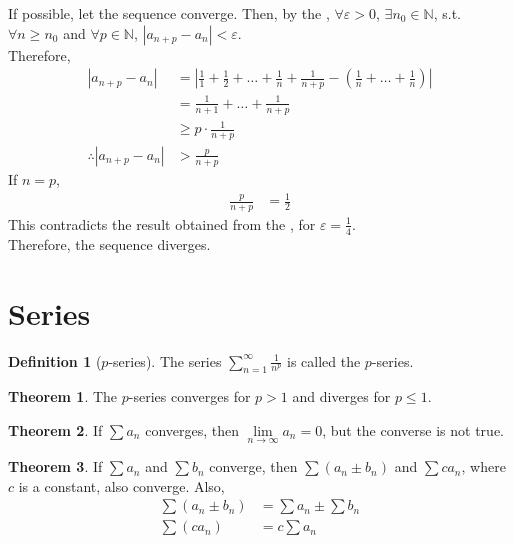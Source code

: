 \documentclass[fleqn, a4paper, 8pt, twoside]{amsart}
\theoremstyle{definition}
\theoremstyle{bluedefinition}
\newtheorem{definition}{Definition}
\theoremstyle{redtheorem}
\newtheorem{theorem}{Theorem}
\begin{document}
\begin{multicols}{2}
\begin{spacing}{0.7}
\begin{solution}
	If possible, let the sequence converge.
	Then, by the , $\forall \varepsilon > 0$, $\exists n_0 \in \mathbb{N}$, s.t. $\forall n \geq n_0$ and $\forall p \in \mathbb{N}$, $|a_{n + p} - a_n| < \varepsilon$.\\
	Therefore,
	\begin{align*}
		|a_{n + p} - a_n| &= \left| \frac{1}{1} + \frac{1}{2} + \dots + \frac{1}{n} + \frac{1}{n + p} - \left( \frac{1}{n} + \dots + \frac{1}{n} \right) \right|\\
		&= \frac{1}{n + 1} + \dots + \frac{1}{n + p}\\
		&\ge p \cdot \frac{1}{n + p}\\
		\therefore |a_{n + p} - a_n| &> \frac{p}{n + p}
	\end{align*}
	If $n = p$,
	\begin{align*}
		\frac{p}{n + p} &= \frac{1}{2}
	\end{align*}
	This contradicts the result obtained from the , for $\varepsilon = \frac{1}{4}$.\\
	Therefore, the sequence diverges.
\end{solution}

\section{Series}

\begin{definition}[$p$-series]
	The series $\sum\limits_{n = 1}^{\infty} \frac{1}{n^p}$ is called the $p$-series.
\end{definition}

\begin{theorem}
	The $p$-series converges for $p > 1$ and diverges for $p \le 1$.
	\label{convergence and divergence of p-series}
\end{theorem}

\begin{theorem}
	If $\sum a_n$ converges, then $\lim\limits_{n \to \infty} a_n = 0$, but the converse is not true.
\end{theorem}

\begin{theorem}
	If $\sum a_n$ and $\sum b_n$ converge, then $\sum (a_n \pm b_n)$ and $\sum c a_n$, where $c$ is a constant, also converge. Also,
	\begin{align*}
		\sum (a_n \pm b_n) &= \sum a_n \pm \sum b_n\\
		\sum (c a_n) &= c \sum a_n
	\end{align*}
\end{theorem}


\end{spacing}
\end{multicols}
\end{document}
